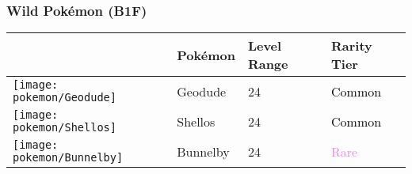 \subsubsection{Wild Pokémon (B1F)}%
\label{ssubsec:WildPokmon(B1F)}%
\begin{longtable}{||l l l l||}%
\hline%
&Pokémon&Level Range&Rarity Tier\\%
\hline%
\endhead%
\hline%
\texttt{[image: pokemon/Geodude]}&Geodude&24&\textcolor{black}{%
Common%
}\\%
\hline%
\texttt{[image: pokemon/Shellos]}&Shellos&24&\textcolor{black}{%
Common%
}\\%
\hline%
\texttt{[image: pokemon/Bunnelby]}&Bunnelby&24&\textcolor{violet}{%
Rare%
}\\%
\hline%
\end{longtable}%
\caption{Wild Pokemon in Oreburgh Gate (B1F)}